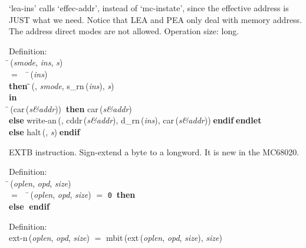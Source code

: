  `lea-ins' calls `effec-addr', instead of `mc-instate', since the effective
 address is JUST what we need.  Notice that LEA and PEA only deal with
 memory address.  The address direct modes are not allowed.
 Operation size: long.
\begin{tabbing}{\sc Definition}: \\  
\=\,({\it{smode\/}}, {\it{ins\/}}, {\it{s\/}}) \\ 
$=$$\;\;\;\;$\=\,({\it{ins\/}}) \\ 
{\bf then }\=\=\,({}, {\it{smode\/}}, {\rm{s\_rn}}\,({\it{ins\/}}), {\it{s\/}})\- \\ 
{\bf in} \\ 
\=\,({\rm{car}}\,({\it{s\&addr\/}}))$\;\;${\bf then }{\rm{car}}\,({\it{s\&addr\/}}) \\ 
{\bf else }{\rm{write-an}}\,({}, {\rm{cddr}}\,({\it{s\&addr\/}}), {\rm{d\_rn}}\,({\it{ins\/}}), {\rm{car}}\,({\it{s\&addr\/}}))$\;${\bf  endif}\-$\;${\bf  endlet}\- \\ 
{\bf else }{\rm{halt}}\,({}, {\it{s\/}})$\;${\bf  endif}\-\-
\end{tabbing}

 EXTB instruction.
 Sign-extend a byte to a longword.  It is new in the MC68020.
\begin{tabbing}{\sc Definition}: \\  
\=\,({\it{oplen\/}}, {\it{opd\/}}, {\it{size\/}}) \\ 
$=$$\;\;\;\;$\=\,({\it{oplen\/}}, {\it{opd\/}}, {\it{size\/}}) $=$ {\tt{0}}$\;\;${\bf then }{} \\ 
{\bf else }{}$\;${\bf  endif}\-\-
\end{tabbing}

\begin{tabbing}{\sc Definition}: \\  
{\rm{ext-n}}\,({\it{oplen\/}}, {\it{opd\/}}, {\it{size\/}}) $=$ {\rm{mbit}}\,({\rm{ext}}\,({\it{oplen\/}}, {\it{opd\/}}, {\it{size\/}}), {\it{size\/}})
\end{tabbing}

